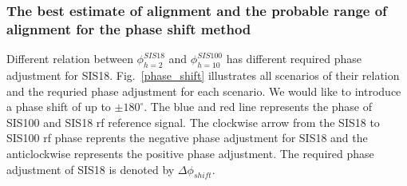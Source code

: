 \subsubsection{The best estimate of alignment and the probable range of alignment for the phase shift method}
Different relation between $\phi_{h=2}^{SIS18}$ and $\phi_{h=10}^{SIS100}$ has different required phase adjustment for SIS18. Fig.~\ref{phase_shift} illustrates all scenarios of their relation and the requried phase adjustment for each scenario. We would like to introduce a phase shift of up to $\pm 180^\circ$. The blue and red line represents the phase of SIS100 and SIS18 rf reference signal. The clockwise arrow from the SIS18 to SIS100 rf phase reprents the negative phase adjustment for SIS18 and the anticlockwise represents the positive phase adjustment. The required phase adjustment of SIS18 is denoted by $\Delta \phi_{shift}$.
